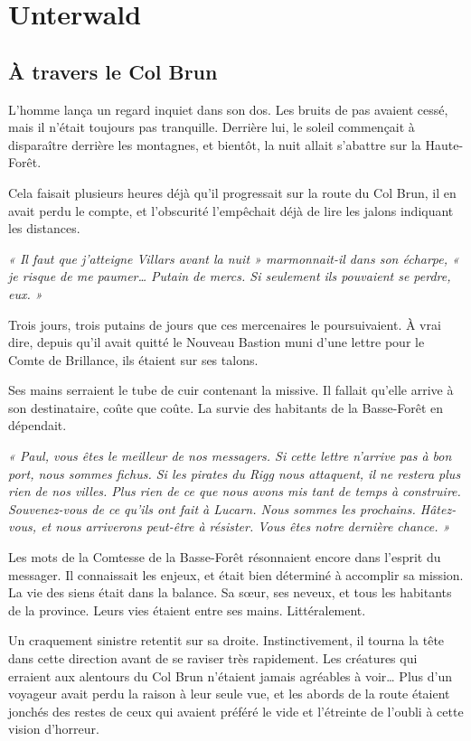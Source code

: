 \chapter{Unterwald}
\newpage

\section{À travers le Col Brun}

L’homme lança un regard inquiet dans son dos. Les bruits de pas avaient cessé, mais il n’était toujours pas tranquille. Derrière lui, le soleil commençait à disparaître derrière les montagnes, et bientôt, la nuit allait s’abattre sur la Haute-Forêt.

Cela faisait plusieurs heures déjà qu’il progressait sur la route du Col Brun, il en avait perdu le compte, et l’obscurité l’empêchait déjà de lire les jalons indiquant les distances.

\emph{« Il faut que j’atteigne Villars avant la nuit » marmonnait-il dans son écharpe, « je risque de me paumer… Putain de mercs. Si seulement ils pouvaient se perdre, eux. »}

Trois jours, trois putains de jours que ces mercenaires le poursuivaient. À vrai dire, depuis qu’il avait quitté le Nouveau Bastion muni d’une lettre pour le Comte de Brillance, ils étaient sur ses talons.

Ses mains serraient le tube de cuir contenant la missive. Il fallait qu’elle arrive à son destinataire, coûte que coûte. La survie des habitants de la Basse-Forêt en dépendait.

\emph{« Paul, vous êtes le meilleur de nos messagers. Si cette lettre n’arrive pas à bon port, nous sommes fichus. Si les pirates du Rigg nous attaquent, il ne restera plus rien de nos villes. Plus rien de ce que nous avons mis tant de temps à construire. Souvenez-vous de ce qu’ils ont fait à Lucarn. Nous sommes les prochains. Hâtez-vous, et nous arriverons peut-être à résister. Vous êtes notre dernière chance. »}

Les mots de la Comtesse de la Basse-Forêt résonnaient encore dans l’esprit du messager. Il connaissait les enjeux, et était bien déterminé à accomplir sa mission. La vie des siens était dans la balance. Sa sœur, ses neveux, et tous les habitants de la province. Leurs vies étaient entre ses mains. Littéralement.

Un craquement sinistre retentit sur sa droite. Instinctivement, il tourna la tête dans cette direction avant de se raviser très rapidement. Les créatures qui erraient aux alentours du Col Brun n’étaient jamais agréables à voir… Plus d’un voyageur avait perdu la raison à leur seule vue, et les abords de la route étaient jonchés des restes de ceux qui avaient préféré le vide et l’étreinte de l’oubli à cette vision d’horreur.

